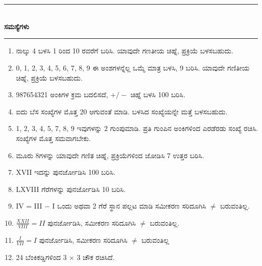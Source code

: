 \chapter[ಅಧ್ಯಾಯ 2]{}\label{chap2}

\begin{center}
\rule{5cm}{1pt}\\[5pt]
{\Large\bfseries ಸಮಸ್ಯೆಗಳು}\\[3pt]
\rule{5cm}{1pt}
\end{center}

\smallskip
\begin{enumerate}
\renewcommand{\labelenumi}{\bf\theenumi.}
\itemsep=5pt
\item ನಾಲ್ಕು 4 ಬಳಸಿ 1 ರಿಂದ 10 ರವರೆಗೆ ಬರಿಸಿ. ಯಾವುದೇ ಗಣತೀಯ ಚಿಹ್ನೆ, ಪ್ರಕ್ರಿಯೆ ಬಳಸಬಹುದು.

\item 0, 1, 2, 3, 4, 5, 6, 7, 8, 9 ಈ ಅಂಶಗಳನ್ನೆಲ್ಲ ಒಮ್ಮೆ ಮಾತ್ರ ಬಳಸಿ, 9 ಬರಿಸಿ. ಯಾವುದೇ ಗಣಿತೀಯ ಚಿಹ್ನೆ, ಪ್ರಕ್ರಿಯೆ ಬಳಸಬಹುದು. 

\item 987654321 ಅಂಕಿಗಳ ಕ್ರಮ ಬದಲಿಸದೆ, $+/-$ ಚಿಹ್ನೆ ಬಳಸಿ 100 ಬರಿಸಿ.

\item ಐದು ಬೆಸ ಸಂಖ್ಯೆಗಳ ಮೊತ್ತ 20 ಆಗುವಂತೆ ಮಾಡಿ. ಬಳಸಿದ ಸಂಖ್ಯೆಯನ್ನೇ ಮತ್ತೆ ಬಳಸಬಹುದು. 

\item 1, 2, 3, 4, 5, 7, 8, 9 ಇವುಗಳನ್ನು 2 ಗುಂಪುಮಾಡಿ. ಪ್ರತಿ ಗುಂಪಿನ ಅಂಕಿ\break ಗಳಿಂದ ಎರಡೆರಡು ಸಂಖ್ಯೆ ರಚಿಸಿ. ಸಂಖ್ಯೆಗಳ ಮೊತ್ತ ಸಮವಾಗಬೇಕು. 

\item ಮೂರು 8ಗಳನ್ನು ಯಾವುದೇ ಗಣಿತ ಚಿಹ್ನೆ, ಪ್ರಕ್ರಿಯೆಗಳಿಂದ ಜೋಡಿಸಿ 7 ಉತ್ತರ ಬರಿಸಿ.

\item XVII ಇದನ್ನು ಪುನರ್ಜೋಡಿಸಿ 100 ಬರಿಸಿ.

\item LXVIII ಗೆರೆಗಳನ್ನು ಪುನರ್ಜೋಡಿಸಿ 10 ಬರಿಸಿ. 

\item IV = III $-$ I ಒಂದು ಅಥವಾ 2 ಗೆರೆ ಸ್ಥಾನ ಪಲ್ಲಟ ಮಾಡಿ ಸಮೀಕರಣ ಸರಿದೂಗಿಸಿ $\neq$ ಬರುವಂತಿಲ್ಲ.

\item $\frac{XXII}{VIII} = II$ ಪುನರ್ಜೋಡಿಸಿ, ಸಮೀಕರಣ ಸರಿದೂಗಿಸಿ $\neq$ ಬರುವಂತಿಲ್ಲ.

\item $\frac{I}{VII} = I$ ಪುನರ್ಜೋಡಿಸಿ, ಸಮೀಕರಣ ಸರಿದೂಗಿಸಿ $\neq$ ಬರುವಂತಿಲ್ಲ

\item 24 ಬೆಂಕಿಕಡ್ಡಿಗಳಿಂದ 3 $\times$ 3 ಚೌಕ ರಚಿಸಿದೆ.


\end{enumerate}
